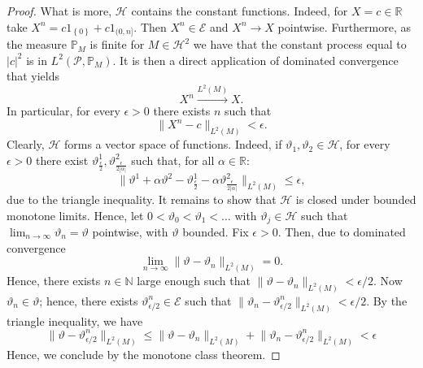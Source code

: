 \documentclass[11pt,a4paper,twoside,openany]{report}
\theoremstyle{plain} %
\theoremstyle{definition} %
\theoremstyle{remark} %
\begin{document}
\begin{proof}
    What is more, \(\mathcal{H}\) contains the constant functions. Indeed, for \(X=c\in\mathbb{R}\) take \(X^n=c1_{\left\{0\right\}}+c1_{(0,n]}\). Then \(X^n\in \mathcal{E}\) and \(X^n\to X\) pointwise. Furthermore, as the measure \(\mathbb{P}_M\) is finite for \(M\in\mathcal{H}^2\) we have that the constant process equal to \(|c|^2\) is in \(L^2(\mathcal{P},\mathbb{P}_M)\). It is then a direct application of dominated convergence that yields 
    \begin{equation}
        X^n\overset{L^2(M)}{\to}X.
    \end{equation}
In particular, for every \(\epsilon>0\) there exists \(n\) such that 
\begin{equation}
    \lVert X^n-c\rVert_{L^2(M)}<\epsilon.
\end{equation}
Clearly, \(\mathcal{H}\) forms a vector space of functions. Indeed, if \(\vartheta_1,\vartheta_2\in\mathcal{H}\), for every \(\epsilon>0\) there exist \(\vartheta^1_{\frac{\epsilon}{2}},\vartheta^2_{\frac{\epsilon}{2|\alpha|}}\) such that, for all \(\alpha\in\mathbb{R}\):
    \begin{equation}
        \lVert \vartheta^1+\alpha \vartheta^2- \vartheta^1_{\frac{\epsilon}{2}}-\alpha \vartheta^2_{\frac{\epsilon}{2|\alpha|}} \rVert_{L^2(M)}\leq \epsilon,
    \end{equation}
    due to the triangle inequality.
 It remains to show that \(\mathcal{H}\) is closed under bounded monotone limits. Hence, let \(0<\vartheta_0<\vartheta_1<\dots\) with \(\vartheta_j\in\mathcal{H}\) such that \(\lim_{n\to\infty}\vartheta_n = \vartheta\) pointwise, with \(\vartheta\) bounded. Fix \(\epsilon>0\). Then, due to dominated convergence 
    \begin{equation}
        \lim_{n\to\infty}\lVert \vartheta-\vartheta_n\rVert_{L^2(M)}=0.
    \end{equation}
    Hence, there exists \(n\in\mathbb{N}\) large enough such that \(\lVert \vartheta-\vartheta_n\rVert_{L^2(M)}<\epsilon/2\). Now \(\vartheta_n\in\mathcal{\vartheta}\); hence, there exists \(\vartheta^n_{\epsilon/2}\in \mathcal{E}\) such that \(\lVert \vartheta_n-\vartheta^n_{\epsilon/2}\rVert_{L^2(M)}<\epsilon/2\). By the triangle inequality, we have
    \begin{equation}
        \lVert \vartheta-\vartheta^n_{\epsilon/2}\rVert_{L^2(M)}\leq\lVert \vartheta-\vartheta_n\rVert_{L^2(M)}+\lVert \vartheta_n-\vartheta^n_{\epsilon/2}\rVert_{L^2(M)}<\epsilon
    \end{equation}
 Hence, we conclude by the monotone class theorem. 
\end{proof}
\end{document}
